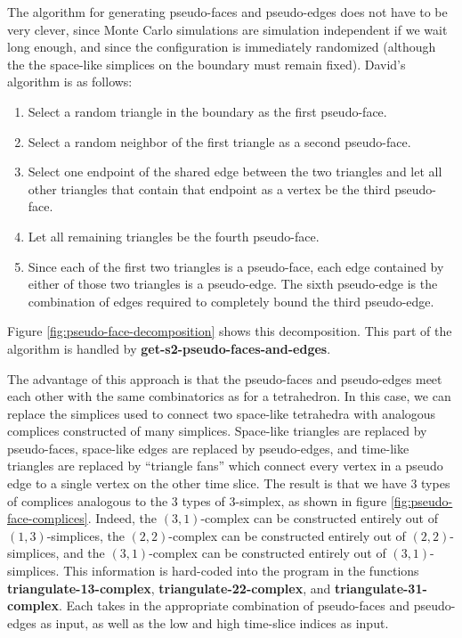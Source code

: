 \message{ !name(programmers_guide.tex)}\documentclass[12pt]{article}
\begin{document}
The algorithm for generating pseudo-faces and pseudo-edges does not
have to be very clever, since Monte Carlo simulations are simulation
independent if we wait long enough, and since the configuration is
immediately randomized (although the the space-like simplices on the
boundary must remain fixed). David's algorithm is as follows:
\begin{enumerate}
\item Select a random triangle in the boundary as the first pseudo-face.
\item Select a random neighbor of the first triangle as a second
  pseudo-face.
\item Select one endpoint of the shared edge between the two triangles
  and let all other triangles that contain that endpoint as a vertex
  be the third pseudo-face.
\item Let all remaining triangles be the fourth pseudo-face.
\item Since each of the first two triangles is a pseudo-face, each
  edge contained by either of those two triangles is a
  pseudo-edge. The sixth pseudo-edge is the combination of edges
  required to completely bound the third pseudo-edge.
\end{enumerate}
Figure \ref{fig:pseudo-face-decomposition} shows this decomposition.
This part of the algorithm is handled by
\textbf{get-s2-pseudo-faces-and-edges}.

The advantage of this approach is that the pseudo-faces and
pseudo-edges meet each other with the same combinatorics as for a
tetrahedron. In this case, we can replace the simplices used to
connect two space-like tetrahedra with analogous complices constructed
of many simplices. Space-like triangles are replaced by pseudo-faces,
space-like edges are replaced by pseudo-edges, and time-like triangles
are replaced by ``triangle fans'' which connect every vertex in a
pseudo edge to a single vertex on the other time slice. The result is
that we have 3 types of complices analogous to the 3 types of
3-simplex, as shown in figure \ref{fig:pseudo-face-complices}. Indeed,
the $(3,1)$-complex can be constructed entirely out of
$(1,3)$-simplices, the $(2,2)$-complex can be constructed entirely out
of $(2,2)$-simplices, and the $(3,1)$-complex can be constructed
entirely out of $(3,1)$-simplices. This information is hard-coded into
the program in the functions \textbf{triangulate-13-complex},
\textbf{triangulate-22-complex}, and
\textbf{triangulate-31-complex}. Each takes in the appropriate
combination of pseudo-faces and pseudo-edges as input, as well as the
low and high time-slice indices as input.
\end{document}
